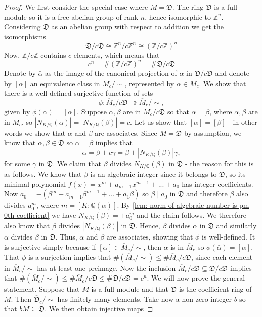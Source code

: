 \documentclass{article}
\newcommand{\mfrak}[1]{\mathfrak{#1}}
\newcommand{\mbb}[1]{\mathbb{#1}}
\begin{document}
\begin{proof}
We first consider the special case where $M = \mfrak D$. The ring $\mfrak D$ is a full module so it is a free abelian group of rank $n$, hence isomorphic to $\mbb Z^n$. Considering $\mfrak D$ as an abelian group with respect to addition we get the isomorphisms
$$\mfrak D/c \mfrak D \cong \mbb Z^n/c \mbb Z^n \cong (\mbb Z/c \mbb Z)^n$$
Now, $\mbb Z / c \mbb Z$ contains $c$ elements, which means that 
$$c^n = \# (\mbb Z/c \mbb Z)^n = \# \mfrak D/c \mfrak D$$
Denote by $\bar \alpha$ as the image of the canonical projection of $\alpha$ in $\mfrak D/c \mfrak D$ and denote by $[\alpha]$ an equivalence class in $\overline M_c / \sim$, represented by $\alpha \in \overline M_c$. We show that there is a well-defined surjective function of sets 
$$\phi : \overline M_c /c \mfrak D \twoheadrightarrow  \overline M_c / \sim,$$
given by $\phi(\bar \alpha) = [\alpha]$. Suppose $\bar \alpha, \bar \beta$ are in $\overline M_c /c \mfrak D$ so that $\bar \alpha = \bar \beta$, where $\alpha, \beta$ are in $\overline M_c$, so $|N_{K/\mbb Q}(\alpha)| = |N_{K/\mbb Q}(\beta)| = c$. Let us show that $[\alpha] = [\beta]$ - in other words we show that $\alpha$ and $\beta$ are associates. Since $M = \mfrak D$ by assumption, we know that $\alpha, \beta \in \mfrak D$ so $\overline \alpha = \overline \beta$ implies that
$$\alpha = \beta + c \gamma = \beta + |N_{K/\mbb Q}(\beta)| \gamma,$$
for some $\gamma$ in $\mfrak D$. We claim that $\beta$ divides $N_{K/\mbb Q}(\beta)$ in $\mathfrak D$ - the reason for this is as follows. We know that $\beta$ is an algebraic integer since it belongs to $\mfrak D$, so its minimal polynomial $f(x) = x^m + a_{m-1}x^{m-1} + ... + a_0$ has integer coefficients. Now $a_0 = -(\beta^m + a_{m-1}\beta^{m-1} + ... + a_1\beta)$ so $\beta \mid a_0$ in $\mfrak D$ and therefore $\beta$ also divides $a_0^m$, where $m = [K : \mbb Q(\alpha)]$. By \cref{lem: norm of algebraic number is pm 0th coefficient} we have $N_{K/\mbb Q}(\beta) = \pm a_0^m$ and the claim follows. We therefore also know that $\beta$ divides $|N_{K/\mbb Q}(\beta)|$ in $\mfrak D$. Hence, $\beta$ divides $\alpha$ in $\mfrak D$ and similarly $\alpha$ divides $\beta$ in $\mfrak D$. Thus, $\alpha$ and $\beta$ are associates, showing that $\phi$ is well-defined. It is surjective simply because if $[\alpha] \in \overline M_c / \sim$, then $\alpha$ is in $\overline M_c$ so $\phi(\bar \alpha) = [\alpha]$. That $\phi$ is a surjection implies that $\# (\overline M_c / \sim) \leq \# \overline M_c / c \mfrak D$, since each element in $\overline M_c /\sim$ has at least one preimage. Now the inclusion $\overline M_c / c \mfrak D \subseteq \mfrak D / c \mfrak D$ implies that $\# (\overline M_c / \sim) \leq \# \overline M_c / c \mfrak D \leq \# \mfrak D / c \mfrak D = c^n$. We will now prove the general statement. Suppose that $M$ is a full module and that $\mfrak D$ is the coefficient ring of $M$. Then $\overline {\mfrak{D}}_c / \sim$ has finitely many elements. Take now a non-zero integer $b$ so that $bM \subseteq \mfrak D$. We then obtain injective maps

\end{proof}
\end{document}
